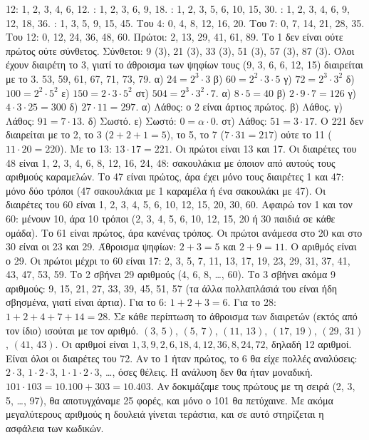  12: 1, 2, 3, 4, 6, 12. : 1, 2, 3, 6, 9, 18. : 1, 2, 3, 5, 6, 10, 15, 30. : 1, 2, 3, 4, 6, 9, 12, 18, 36. : 1, 3, 5, 9, 15, 45.
 Του 4: 0, 4, 8, 12, 16, 20. Του 7: 0, 7, 14, 21, 28, 35. Του 12: 0, 12, 24, 36, 48, 60.
 Πρώτοι: 2, 13, 29, 41, 61, 89. Το 1 δεν είναι ούτε πρώτος ούτε σύνθετος. Σύνθετοι: 9 (3), 21 (3), 33 (3), 51 (3), 57 (3), 87 (3). Όλοι έχουν διαιρέτη το 3, γιατί το άθροισμα των ψηφίων τους (9, 3, 6, 6, 12, 15) διαιρείται με το 3.
 53, 59, 61, 67, 71, 73, 79.
 α) $24=2^3\cdot 3$ \quad β) $60=2^2\cdot 3\cdot 5$ \quad γ) $72=2^3\cdot 3^2$ \quad δ) $100=2^2\cdot 5^2$ \quad ε) $150=2\cdot 3\cdot 5^2$ \quad στ) $504=2^3\cdot 3^2\cdot 7$.
 α) $8\cdot 5=40$ \quad β) $2\cdot 9\cdot 7=126$ \quad γ) $4\cdot 3\cdot 25=300$ \quad δ) $27\cdot 11=297$.
 α) Λάθος: ο 2 είναι άρτιος πρώτος. β) Λάθος. γ) Λάθος: $91=7\cdot 13$. δ) Σωστό. ε) Σωστό: $0=\alpha\cdot 0$. στ) Λάθος: $51=3\cdot 17$.
 Ο 221 δεν διαιρείται με το 2, το 3 ($2+2+1=5$), το 5, το 7 ($7\cdot 31=217$) ούτε το 11 ($11\cdot 20=220$). Με το 13: $13\cdot 17=221$. Οι πρώτοι είναι 13 και 17.
 Οι διαιρέτες του 48 είναι 1, 2, 3, 4, 6, 8, 12, 16, 24, 48: σακουλάκια με όποιον από αυτούς τους αριθμούς καραμελών. Το 47 είναι πρώτος, άρα έχει μόνο τους διαιρέτες 1 και 47: μόνο δύο τρόποι (47 σακουλάκια με 1 καραμέλα ή ένα σακουλάκι με 47).
 Οι διαιρέτες του 60 είναι 1, 2, 3, 4, 5, 6, 10, 12, 15, 20, 30, 60. Αφαιρώ τον 1 και τον 60: μένουν 10, άρα 10 τρόποι (2, 3, 4, 5, 6, 10, 12, 15, 20 ή 30 παιδιά σε κάθε ομάδα). Το 61 είναι πρώτος, άρα κανένας τρόπος.
 Οι πρώτοι ανάμεσα στο 20 και στο 30 είναι οι 23 και 29. Άθροισμα ψηφίων: $2+3=5$ και $2+9=11$. Ο αριθμός είναι ο 29.
 Οι πρώτοι μέχρι το 60 είναι 17: 2, 3, 5, 7, 11, 13, 17, 19, 23, 29, 31, 37, 41, 43, 47, 53, 59. Το 2 σβήνει 29 αριθμούς (4, 6, 8, \dots, 60). Το 3 σβήνει ακόμα 9 αριθμούς: 9, 15, 21, 27, 33, 39, 45, 51, 57 (τα άλλα πολλαπλάσιά του είναι ήδη σβησμένα, γιατί είναι άρτια).
 Για το 6: $1+2+3=6$. Για το 28: $1+2+4+7+14=28$. Σε κάθε περίπτωση το άθροισμα των διαιρετών (εκτός από τον ίδιο) ισούται με τον αριθμό.
 $(3,\,5)$, $(5,\,7)$, $(11,\,13)$, $(17,\,19)$, $(29,\,31)$, $(41,\,43)$.
 Οι αριθμοί είναι $1, 3, 9, 2, 6, 18, 4, 12, 36, 8, 24, 72$, δηλαδή 12 αριθμοί. Είναι όλοι οι διαιρέτες του 72.
 Αν το 1 ήταν πρώτος, το 6 θα είχε πολλές αναλύσεις: $2\cdot 3$, $1\cdot 2\cdot 3$, $1\cdot 1\cdot 2\cdot 3$, \dots, όσες θέλεις. Η ανάλυση δεν θα ήταν μοναδική.
 $101\cdot 103=10.100+303=10.403$. Αν δοκιμάζαμε τους πρώτους με τη σειρά (2, 3, 5, \dots, 97), θα αποτυγχάναμε 25 φορές, και μόνο ο 101 θα πετύχαινε. Με ακόμα μεγαλύτερους αριθμούς η δουλειά γίνεται τεράστια, και σε αυτό στηρίζεται η ασφάλεια των κωδικών.
